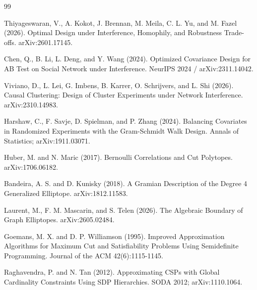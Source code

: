 \documentclass{article}
\begin{document}
\begin{thebibliography}{99}

   Thiyageswaran, V., A. Kokot, J. Brennan, M. Meila, C. L. Yu, and M. Fazel (2026). Optimal Design under Interference, Homophily, and Robustness Trade-offs. arXiv:2601.17145.

   Chen, Q., B. Li, L. Deng, and Y. Wang (2024). Optimized Covariance Design for AB Test on Social Network under Interference. NeurIPS 2024 / arXiv:2311.14042.

   Viviano, D., L. Lei, G. Imbens, B. Karrer, O. Schrijvers, and L. Shi (2026). Causal Clustering: Design of Cluster Experiments under Network Interference. arXiv:2310.14983.

   Harshaw, C., F. Savje, D. Spielman, and P. Zhang (2024). Balancing Covariates in Randomized Experiments with the Gram-Schmidt Walk Design. Annals of Statistics; arXiv:1911.03071.

   Huber, M. and N. Maric (2017). Bernoulli Correlations and Cut Polytopes. arXiv:1706.06182.

   Bandeira, A. S. and D. Kunisky (2018). A Gramian Description of the Degree 4 Generalized Elliptope. arXiv:1812.11583.

   Laurent, M., F. M. Mascarin, and S. Telen (2026). The Algebraic Boundary of Graph Elliptopes. arXiv:2605.02484.

   Goemans, M. X. and D. P. Williamson (1995). Improved Approximation Algorithms for Maximum Cut and Satisfiability Problems Using Semidefinite Programming. Journal of the ACM 42(6):1115-1145.

   Raghavendra, P. and N. Tan (2012). Approximating CSPs with Global Cardinality Constraints Using SDP Hierarchies. SODA 2012; arXiv:1110.1064.

\end{thebibliography}
\end{document}
